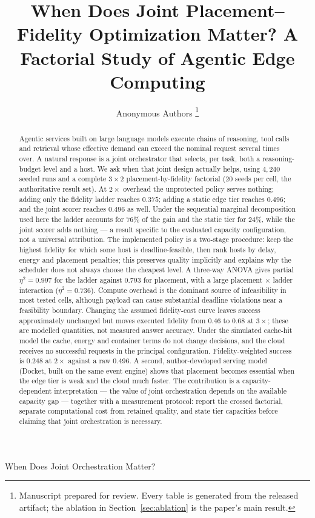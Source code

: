 \documentclass[journal,10pt]{IEEEtran}
\begin{document}
\title{When Does Joint Placement--Fidelity Optimization Matter? A Factorial
Study of Agentic Edge Computing}

\author{Anonymous Authors%
\thanks{Manuscript prepared for review. Every table is generated from the
released artifact; the ablation in Section~\ref{sec:ablation} is the paper's
main result.}}

%
{When Does Joint Orchestration Matter?}
\maketitle

\begin{abstract}
Agentic services built on large language models execute chains of reasoning,
tool calls and retrieval whose effective demand can exceed the nominal request
several times over. A natural response is a joint orchestrator that selects, per
task, both a reasoning-budget level and a host. We ask when that joint design
actually helps, using $4{,}240$ seeded runs and a complete $3\times2$
placement-by-fidelity factorial (20 seeds per cell, the authoritative result
set). At $2\times$ overhead the unprotected policy serves nothing; adding only
the fidelity ladder reaches $0.375$; adding a static edge tier reaches $0.496$;
and the joint scorer reaches $0.496$ as well. Under the sequential marginal
decomposition used here the ladder accounts for $76\%$ of the gain and the
static tier for $24\%$, while the joint scorer adds nothing --- a result specific
to the evaluated capacity configuration, not a universal attribution. The
implemented policy is a two-stage procedure: keep the highest fidelity for which
some host is deadline-feasible, then rank hosts by delay, energy and placement
penalties; this preserves quality implicitly and explains why the scheduler does
not always choose the cheapest level. A three-way ANOVA gives partial
$\eta^2=0.997$ for the ladder against $0.793$ for placement, with a large
placement $\times$ ladder interaction ($\eta^2=0.736$). Compute overhead is the
dominant source of infeasibility in most tested cells, although payload can
cause substantial deadline violations near a feasibility boundary. Changing the
assumed fidelity-cost curve leaves success approximately unchanged but moves
executed fidelity from $0.46$ to $0.68$ at $3\times$; these are modelled
quantities, not measured answer accuracy. Under the simulated cache-hit model the
cache, energy and container terms do not change decisions, and the cloud
receives no successful requests in the principal configuration. Fidelity-weighted
success is $0.248$ at $2\times$ against a raw $0.496$. A second, author-developed
serving model (Docket, built on the same event engine) shows that placement becomes essential when the edge
tier is weak and the cloud much faster. The contribution is a capacity-dependent
interpretation --- the value of joint orchestration depends on the available
capacity gap --- together with a measurement protocol: report the crossed
factorial, separate computational cost from retained quality, and state tier
capacities before claiming that joint orchestration is necessary.
\end{abstract}
\end{document}
